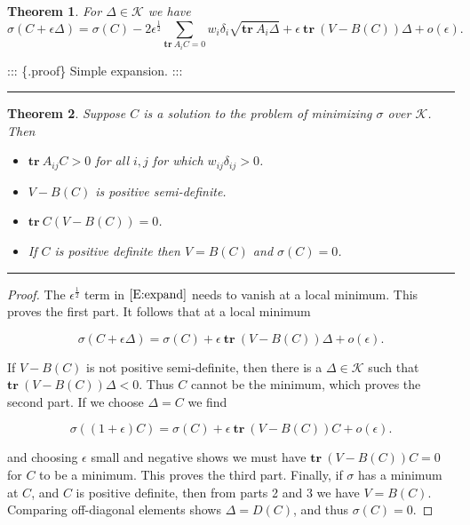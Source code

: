 \documentclass[
  12pt,
]{book}
\providecommand{\tightlist}{%
  \setlength{\itemsep}{0pt}\setlength{\parskip}{0pt}}
\newtheorem{theorem}{Theorem}[chapter]
\theoremstyle{definition}
\theoremstyle{definition}
\theoremstyle{definition}
\theoremstyle{definition}
\theoremstyle{remark}
\begin{document}
\begin{theorem}
\protect\hypertarget{thm:ozo}{}{\label{thm:ozo} }For \(\Delta\in\mathcal{K}\) we have
\begin{equation}
\sigma(C+\epsilon\Delta)=\sigma(C)-2\epsilon^{\frac12}\sum_{\mathbf{tr}\ A_iC = 0}w_i\delta_i\sqrt{\mathbf{tr}\ A_i\Delta}+\epsilon\ \mathbf{tr}\ (V-B(C))\Delta
+o(\epsilon).\label{E:expand}
\end{equation}
\end{theorem}
::: \{.proof\}
Simple expansion.
:::

\begin{center}\rule{0.5\linewidth}{0.5pt}\end{center}

\begin{theorem}
\protect\hypertarget{thm:rockafellar}{}{\label{thm:rockafellar} }Suppose \(C\) is a solution to the problem of minimizing \(\sigma\) over \(\mathcal{K}\). Then

\begin{itemize}
\tightlist
\item
  \(\mathbf{tr}\ A_{ij}C > 0\) for all \(i,j\) for which \(w_{ij}\delta_{ij}>0\).
\item
  \(V-B(C)\) is positive semi-definite.
\item
  \(\mathbf{tr}\ C(V-B(C))=0\).
\item
  If \(C\) is positive definite then \(V=B(C)\) and \(\sigma(C)=0\).
\end{itemize}
\end{theorem}

\begin{center}\rule{0.5\linewidth}{0.5pt}\end{center}

\begin{proof}
The \(\epsilon^\frac12\) term in \(\eqref{E:expand}\) needs to vanish at a local minimum. This proves the first part. It follows that at a local minimum

\begin{equation*}
\sigma(C+\epsilon\Delta)=\sigma(C)+
\epsilon\ \mathbf{tr}\ (V-B(C))\Delta+o(\epsilon).
\end{equation*}

If \(V-B(C)\) is not positive semi-definite, then there is a \(\Delta\in\mathcal{K}\) such that
\(\mathbf{tr}\ (V-B(C))\Delta < 0\). Thus \(C\) cannot be the minimum, which proves the second part.
If we choose \(\Delta=C\) we find

\begin{equation*}
\sigma((1+\epsilon)C)=\sigma(C)+
\epsilon\ \mathbf{tr}\ (V-B(C))C+o(\epsilon).
\end{equation*}

and choosing \(\epsilon\) small and negative shows we must have \(\mathbf{tr}\ (V-B(C))C=0\) for
\(C\) to be a minimum. This proves the third part. Finally, if \(\sigma\) has a minimum at \(C\),
and \(C\) is positive definite, then from parts 2 and 3 we have \(V=B(C)\). Comparing off-diagonal
elements shows \(\Delta=D(C)\), and thus \(\sigma(C)=0\).
\end{proof}
\end{document}
